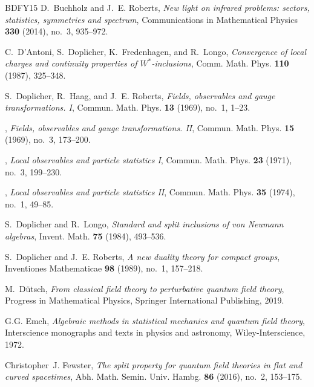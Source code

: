 \documentclass[12pt,a4paper]{article}
\newcommand{\1}{\mathds{1}}                         %
\begin{document}
{\begin{thebibliography}{BDFY15}
		D.~Buchholz and J.~E. Roberts, \emph{New light on infrared problems: sectors,
			statistics, symmetries and spectrum}, Communications in Mathematical Physics
		\textbf{330} (2014), no.~3, 935--972.
		
		C.~D'Antoni, S.~Doplicher, K.~Fredenhagen, and R.~Longo, \emph{Convergence of
			local charges and continuity properties of {$W^*$}-inclusions}, Comm. Math.
		Phys. \textbf{110} (1987), 325--348. 
		
		S.~Doplicher, R.~Haag, and J.~E. Roberts, \emph{Fields, observables and gauge
			transformations. {I}}, Commun. Math. Phys. \textbf{13} (1969), no.~1, 1--23.
		
		\bysame, \emph{Fields, observables and gauge transformations. {II}}, Commun.
		Math. Phys. \textbf{15} (1969), no.~3, 173--200.
		
		\bysame, \emph{Local observables and particle statistics {I}}, Commun. Math.
		Phys. \textbf{23} (1971), no.~3, 199--230.
		
		\bysame, \emph{Local observables and particle statistics {II}}, Commun. Math.
		Phys. \textbf{35} (1974), no.~1, 49--85.
		
		S.~Doplicher and R.~Longo, \emph{Standard and split inclusions of von {N}eumann
			algebras}, Invent. Math. \textbf{75} (1984), 493--536. 
		
		S.~Doplicher and J.~E. Roberts, \emph{A new duality theory for compact groups},
		Inventiones Mathematicae \textbf{98} (1989), no.~1, 157--218.
		
		M.~D{\"u}tsch, \emph{From classical field theory to perturbative quantum field
			theory}, Progress in Mathematical Physics, Springer International Publishing,
		2019.
		
		G.G. Emch, \emph{Algebraic methods in statistical mechanics and quantum field
			theory}, Interscience monographs and texts in physics and astronomy,
		Wiley-Interscience, 1972.
		
		Christopher~J. Fewster, \emph{The split property for quantum field theories in
			flat and curved spacetimes}, Abh. Math. Semin. Univ. Hambg. \textbf{86}
		(2016), no.~2, 153--175. 
		

\end{thebibliography}}
\end{document}
